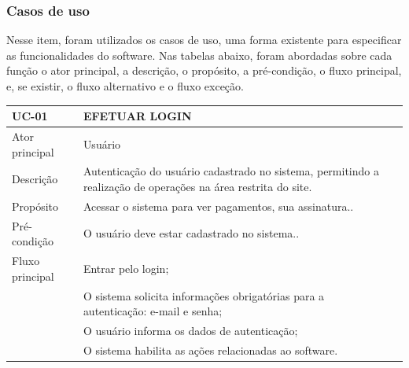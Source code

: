 \documentclass[a4paper,12pt]{article}
\begin{document}
\newpage
\subsubsection{Casos de uso}
\hspace{0.5cm}Nesse item, foram utilizados os casos de uso, uma forma existente para especificar
as funcionalidades do software. Nas tabelas abaixo, foram abordadas sobre cada função o
ator principal, a descrição, o propósito, a pré-condição, o fluxo principal, e, se existir, o fluxo
alternativo e o fluxo exceção.
\begin{table}[ht]
    \centering
    \begin{tabular}{|p{3.5cm}|p{10cm}|p{7cm}|}
        \hline
        \textbf{UC-01}                  & \textbf{EFETUAR LOGIN}                                                           \\
        \hline

        \multirow{1}{*}{Ator principal} & Usuário                                                                          \\
        \hline
        \multirow{1}{*}{Descrição}      & Autenticação do usuário cadastrado no sistema, permitindo a realização
        de operações na área restrita do site.                                                                             \\
        \hline

        \multirow{1}{*}{Propósito}      & Acessar o sistema para ver pagamentos, sua assinatura..                          \\
        \hline

        \multirow{1}{*}{Pré-condição}   & O usuário deve estar cadastrado no sistema..                                     \\
        \hline

        \multirow{1}{*}{Fluxo principal}
                                        & Entrar pelo login;                                                               \\
                                        & O sistema solicita informações obrigatórias para a autenticação: e-mail e senha; \\
                                        & O usuário informa os dados de autenticação;                                      \\
                                        & O sistema habilita as ações relacionadas ao software.                            \\
        \cline{2-2}
        \hline


\end{tabular}
\end{table}
\end{document}
